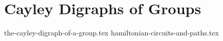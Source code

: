 \chapter{Cayley Digraphs of Groups}
{the-cayley-digraph-of-a-group.tex}
{hamiltonian-circuits-and-paths.tex}
